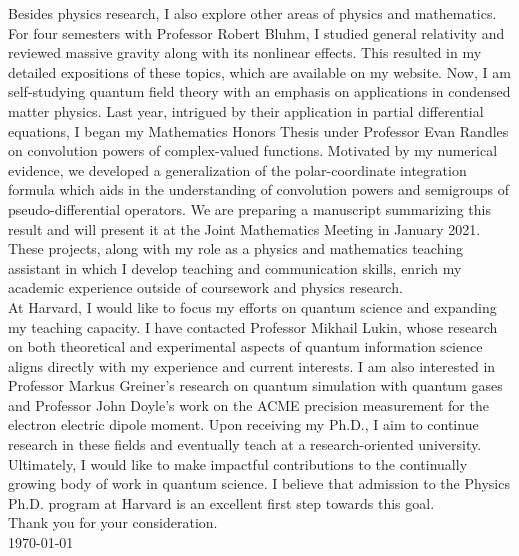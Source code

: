 \documentclass[12pt]{article}
\begin{document}
Besides physics research, I also explore other areas of physics and mathematics. For four semesters with Professor Robert Bluhm, I studied general relativity and reviewed massive gravity along with its nonlinear effects. This resulted in my detailed expositions of these topics, which are available on my website. Now, I am self-studying quantum field theory with an emphasis on applications in condensed matter physics. Last year, intrigued by their application in partial differential equations, I began my Mathematics Honors Thesis under Professor Evan Randles on convolution powers of complex-valued functions. Motivated by my numerical evidence, we developed a generalization of the polar-coordinate integration formula which aids in the understanding of convolution powers and semigroups of pseudo-differential operators. We are preparing a manuscript summarizing this result and will present it at the Joint Mathematics Meeting in January 2021. These projects, along with my role as a physics and mathematics teaching assistant in which I develop teaching and communication skills, enrich my academic experience outside of coursework and physics research.  \\ 


At Harvard, I would like to focus my efforts on quantum science and expanding my teaching capacity. I have contacted Professor Mikhail Lukin, whose research on both theoretical and experimental aspects of quantum information science aligns directly with my experience and current interests. I am also interested in Professor Markus Greiner's research on quantum simulation with quantum gases and Professor John Doyle's work on the ACME precision measurement for the electron electric dipole moment. Upon receiving my Ph.D., I aim to continue research in these fields and eventually teach at a research-oriented university. Ultimately, I would like to make impactful contributions to the continually growing body of work in quantum science. I believe that admission to the Physics Ph.D. program at Harvard is an excellent first step towards this goal. \\


\noindent Thank you for your consideration. \\

\noindent \today
	











	
	
	
	
	
\end{document}
